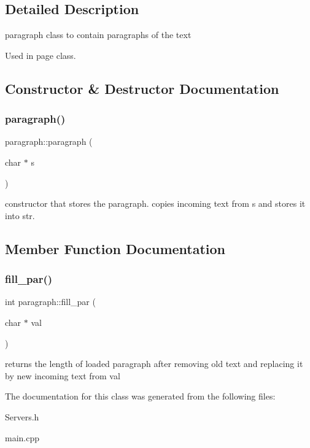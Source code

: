 \subsection{Detailed Description}
paragraph class to contain paragraphs of the text 

Used in page class. 

\subsection{Constructor \& Destructor Documentation}
\mbox{\label{classparagraph_a7dafd3517c2c11bf597b54eace6ae92c}} 
\subsubsection{\texorpdfstring{paragraph()}{paragraph()}}
{\footnotesize\ttfamily paragraph\+::paragraph (\begin{DoxyParamCaption}\item[{char $\ast$}]{s }\end{DoxyParamCaption})\hspace{0.3cm}{\ttfamily [inline]}}

constructor that stores the paragraph. copies incoming text from s and stores it into str. 

\subsection{Member Function Documentation}
\mbox{\label{classparagraph_a3be51295931921fa55765033675e45dd}} 
\subsubsection{\texorpdfstring{fill\+\_\+par()}{fill\_par()}}
{\footnotesize\ttfamily int paragraph\+::fill\+\_\+par (\begin{DoxyParamCaption}\item[{char $\ast$}]{val }\end{DoxyParamCaption})}

returns the length of loaded paragraph after removing old text and replacing it by new incoming text from val 

The documentation for this class was generated from the following files\+:\begin{DoxyCompactItemize}
\item 
Servers.\+h\item 
main.\+cpp\end{DoxyCompactItemize}
